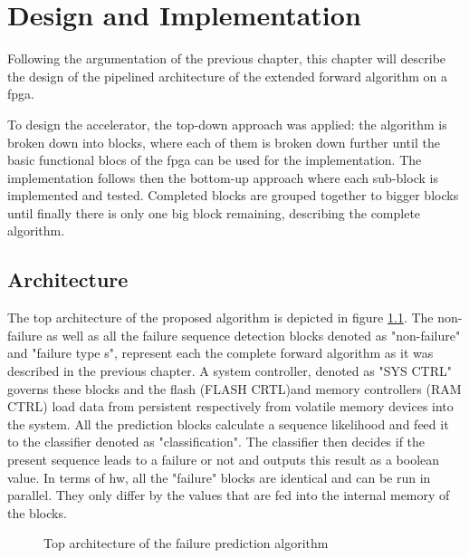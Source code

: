 \documentclass[mscthesis]{usiinfthesis}
\begin{document}
\chapter{Design and Implementation}
\label{ch:design}
\glsresetall %

Following the argumentation of the previous chapter, this chapter will describe
the design of the pipelined architecture of the extended forward algorithm on
a \gls{fpga}.

To design the accelerator, the top-down approach was applied: the algorithm is
broken down into blocks, where each of them is broken down further until the
basic functional blocs of the \gls{fpga} can be used for the implementation. The
implementation follows then the bottom-up approach where each sub-block is
implemented and tested. Completed blocks are grouped together to bigger blocks
until finally there is only one big block remaining, describing the complete
algorithm.

\section{Architecture}
\label{ch:design_arch}

The top architecture of the proposed algorithm is depicted in figure
\ref{fig:arch_top}. The non-failure as well as all the failure sequence
detection blocks denoted as "non-failure" and "failure type s", represent each
the complete forward algorithm as it was described in the previous chapter.
A system controller, denoted as "SYS CTRL" governs these blocks and the flash
(FLASH CRTL)and memory controllers (RAM CTRL) load data from persistent
respectively from volatile memory devices into the system. All the prediction
blocks calculate a sequence likelihood and feed it to the classifier denoted as
"classification". The classifier then decides if the present sequence leads to
a failure or not and outputs this result as a boolean value. In terms of
\gls{hw}, all the "failure" blocks are identical and can be run in parallel.
They only differ by the values that are fed into the internal memory of the
blocks.

\begin{figure}
    \centering
    
    \caption{Top architecture of the failure prediction algorithm}
    \label{fig:arch_top}
\end{figure}
\end{document}
